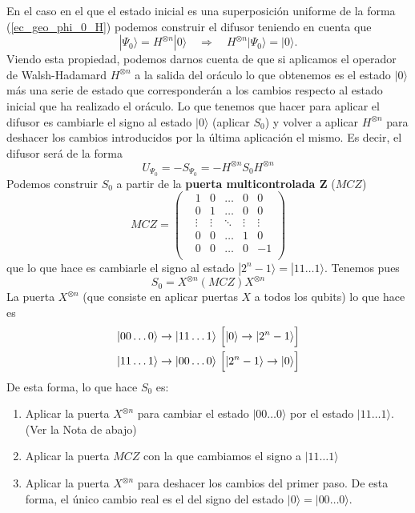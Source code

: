 \documentclass[a4paper,11pt]{article} %
\numberwithin{equation}{section}
\def\lp{\left(}
\def\rp{\right)}
\def\Lc{\Bigl[}
\def\Rc{\Bigr]}
\def\rqa{\quad \Rightarrow \quad}
\begin{document}
En el caso en el que el estado inicial es una superposición uniforme de la forma (\ref{ec_geo_phi_0_H}) podemos construir el difusor teniendo en cuenta que
\begin{equation}
|\Psi_0 \rangle = H^{\otimes n} |0 \rangle \rqa H^{\otimes n} |\Psi_0 \rangle = |0 \rangle.
\end{equation}
Viendo esta propiedad, podemos darnos cuenta de que si aplicamos el operador de Walsh-Hadamard $H^{\otimes n}$ a la salida del oráculo lo que obtenemos es el estado $| 0 \rangle$ más una serie de estado que corresponderán a los cambios respecto al estado inicial que ha realizado el oráculo. Lo que tenemos que hacer para aplicar el difusor es cambiarle el signo al estado $| 0 \rangle$ (aplicar $S_0$) y volver a aplicar $H^{\otimes n}$ para deshacer los cambios introducidos por la última aplicación el mismo. Es decir, el difusor será de la forma
\begin{equation}
U_{\Psi_0} = - S_{\Psi_0}= - H^{\otimes n} S_0 H^{\otimes n}
\end{equation}
Podemos construir $S_0$ a partir de la \textbf{puerta multicontrolada Z} ($MCZ$)
\begin{equation}
MCZ = 
	\lp
		\begin{matrix}
			& 1 & 0  & \dots & 0 & 0 \\
			& 0 & 1  & \dots & 0 & 0 \\
			& \vdots  & \vdots & \ddots & \vdots & \vdots \\
			& 0 & 0 & \dots & 1 & 0 \\
			& 0 & 0 & \dots & 0 & -1 \\
		\end{matrix}
	\rp
\end{equation}
que lo que hace es cambiarle el signo al estado $|2^n-1\rangle= | 11 \dots 1\rangle$. Tenemos pues
\begin{equation}
S_0 = X^{\otimes n} (MCZ) X^{\otimes n}
\end{equation}
La puerta $X^{\otimes n}$ (que consiste en aplicar puertas $X$ a todos los qubits) lo que hace es 
\begin{align*}
& |00 \dots 0 \rangle \rightarrow |11 \dots 1 \rangle \, \, \Lc |0 \rangle \rightarrow | 2^n-1 \rangle \Rc \\
& |11 \dots 1 \rangle \rightarrow |00 \dots 0 \rangle \, \, \Lc |2^n-1 \rangle \rightarrow | 0 \rangle \Rc
\end{align*}
De esta forma, lo que hace $S_{0}$ es: 
\begin{enumerate}
	\item Aplicar la puerta $X^{\otimes n}$ para cambiar el estado $|00 \dots 0 \rangle$ por el estado $|11 \dots 1 \rangle$. (Ver la Nota de abajo)
	
	\item Aplicar la puerta $MCZ$ con la que cambiamos el signo a $|11 \dots 1 \rangle$ 
	
	\item Aplicar la puerta $X^{\otimes n}$ para deshacer los cambios del primer paso. De esta forma, el único cambio real es el del signo del estado $|0\rangle = |00 \dots 0 \rangle$.
\end{enumerate}
\end{document}
